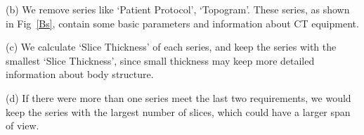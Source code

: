 \documentclass[journal]{IEEEtran}
\begin{document}
(b) We remove series like `Patient Protocol', `Topogram'. These series, as shown in Fig~\ref{Bs}, contain some basic parameters and information about CT equipment.

(c) We calculate `Slice Thickness' of each series, and keep the series with the smallest `Slice Thickness', since small thickness may keep more detailed information about body structure. 

(d) If there were more than one series meet the last two requirements, we would keep the series with the largest number of slices, which could have a larger span of view.
\begin{figure}[htbp]
    \centering


\end{figure}
\end{document}
